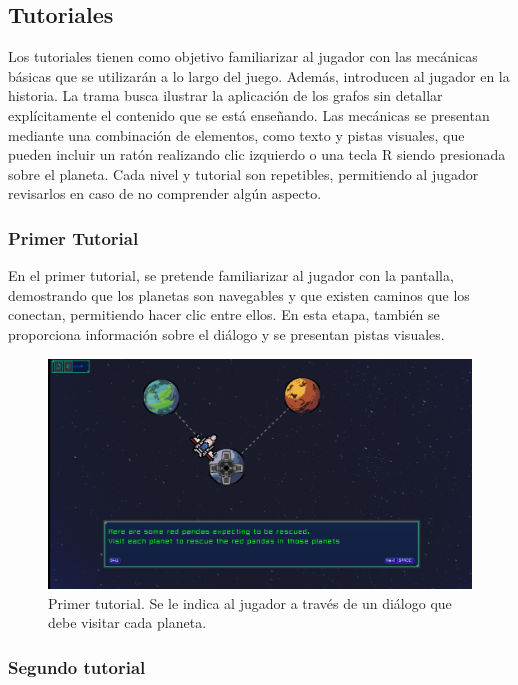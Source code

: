 \subsection{Tutoriales}

Los tutoriales tienen como objetivo familiarizar al jugador con las mecánicas básicas que se utilizarán a lo largo del juego. Además, introducen al jugador en la historia. La trama busca ilustrar la aplicación de los grafos sin detallar explícitamente el contenido que se está enseñando. Las mecánicas se presentan mediante una combinación de elementos, como texto y pistas visuales, que pueden incluir un ratón realizando clic izquierdo o una tecla R siendo presionada sobre el planeta. Cada nivel y tutorial son repetibles, permitiendo al jugador revisarlos en caso de no comprender algún aspecto.

\subsubsection{Primer Tutorial}

En el primer tutorial, se pretende familiarizar al jugador con la pantalla, demostrando que los planetas son navegables y que existen caminos que los conectan, permitiendo hacer clic entre ellos. En esta etapa, también se proporciona información sobre el diálogo y se presentan pistas visuales.


\begin{figure}[h]
	\centering
	\includegraphics[scale=0.3]{imagenes/FirstTutorial.png}
	\caption{Primer tutorial. Se le indica al jugador a través de un diálogo que debe visitar cada planeta.}
	\label{FirstTutorial}
\end{figure}



\subsubsection{Segundo tutorial}

